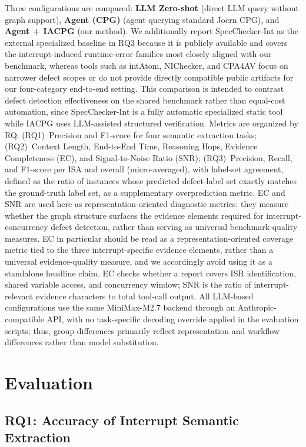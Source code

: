 \documentclass[a4paper,UKenglish,cleveref, autoref, thm-restate]{lipics-v2021}
\begin{document}
Three configurations are compared: \textbf{LLM Zero-shot} (direct LLM query without graph support), \textbf{Agent (CPG)} (agent querying standard Joern CPG), and \textbf{Agent + IACPG} (our method). We additionally report SpecChecker-Int as the external specialized baseline in RQ3 because it is publicly available and covers the interrupt-induced runtime-error families most closely aligned with our benchmark, whereas tools such as intAtom, NIChecker, and CPA4AV focus on narrower defect scopes or do not provide directly compatible public artifacts for our four-category end-to-end setting. This comparison is intended to contrast defect detection effectiveness on the shared benchmark rather than equal-cost automation, since SpecChecker-Int is a fully automatic specialized static tool while IACPG uses LLM-assisted structured verification. Metrics are organized by RQ: (RQ1)~Precision and F1-score for four semantic extraction tasks; (RQ2)~Context Length, End-to-End Time, Reasoning Hops, Evidence Completeness (EC), and Signal-to-Noise Ratio (SNR); (RQ3)~Precision, Recall, and F1-score per ISA and overall (micro-averaged), with label-set agreement, defined as the ratio of instances whose predicted defect-label set exactly matches the ground-truth label set, as a supplementary overprediction metric. EC and SNR are used here as representation-oriented diagnostic metrics: they measure whether the graph structure surfaces the evidence elements required for interrupt-concurrency defect detection, rather than serving as universal benchmark-quality measures. EC in particular should be read as a representation-oriented coverage metric tied to the three interrupt-specific evidence elements, rather than a universal evidence-quality measure, and we accordingly avoid using it as a standalone headline claim. EC checks whether a report covers ISR identification, shared variable access, and concurrency window; SNR is the ratio of interrupt-relevant evidence characters to total tool-call output. All LLM-based configurations use the same MiniMax-M2.7 backend through an Anthropic-compatible API, with no task-specific decoding override applied in the evaluation scripts; thus, group differences primarily reflect representation and workflow differences rather than model substitution.

\section{Evaluation}

\subsection{RQ1: Accuracy of Interrupt Semantic Extraction}
\end{document}
